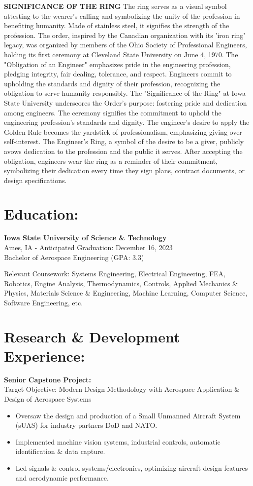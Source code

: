 \documentclass[letterpaper,10pt]{article}
\begin{document}
\textbf{SIGNIFICANCE OF THE RING}
The ring serves as a visual symbol attesting to the wearer's calling and symbolizing the unity of the profession in benefiting humanity. Made of stainless steel, it signifies the strength of the profession. The order, inspired by the Canadian organization with its 'iron ring' legacy, was organized by members of the Ohio Society of Professional Engineers, holding its first ceremony at Cleveland State University on June 4, 1970.
The "Obligation of an Engineer" emphasizes pride in the engineering profession, pledging integrity, fair dealing, tolerance, and respect. Engineers commit to upholding the standards and dignity of their profession, recognizing the obligation to serve humanity responsibly.
The "Significance of the Ring" at Iowa State University underscores the Order's purpose: fostering pride and dedication among engineers. The ceremony signifies the commitment to uphold the engineering profession's standards and dignity. The engineer's desire to apply the Golden Rule becomes the yardstick of professionalism, emphasizing giving over self-interest.
The Engineer's Ring, a symbol of the desire to be a giver, publicly avows dedication to the profession and the public it serves. After accepting the obligation, engineers wear the ring as a reminder of their commitment, symbolizing their dedication every time they sign plans, contract documents, or design specifications.



\section*{Education:}
\textbf{Iowa State University of Science \& Technology} \\
Ames, IA - Anticipated Graduation: December 16, 2023 \\
Bachelor of Aerospace Engineering (GPA: 3.3)

Relevant Coursework: Systems Engineering, Electrical Engineering, FEA, Robotics, Engine Analysis, Thermodynamics, Controls, Applied Mechanics \& Physics, Materials Science \& Engineering, Machine Learning, Computer Science, Software Engineering, etc.

\section*{Research \& Development Experience:}

\textbf{Senior Capstone Project:} \\
Target Objective: Modern Design Methodology with Aerospace Application \& Design of Aerospace Systems
\begin{itemize}
    \item Oversaw the design and production of a Small Unmanned Aircraft System (sUAS) for industry partners DoD and NATO.
    \item Implemented machine vision systems, industrial controls, automatic identification \& data capture.
    \item Led signals \& control systems/electronics, optimizing aircraft design features and aerodynamic performance.
\end{itemize}
\end{document}
